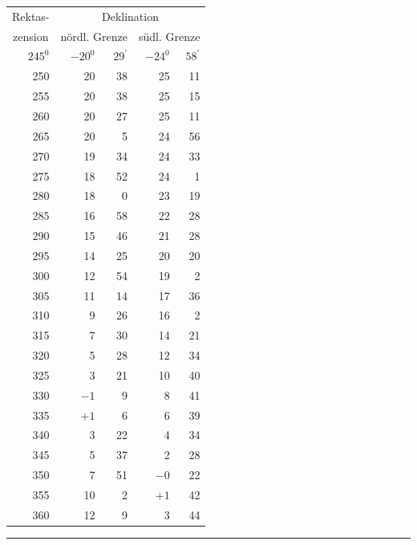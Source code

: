 \begin{center}
\begin{tabular}{|r|r@{\;}r|r@{\;}r|}
\multicolumn{1}{|c|}{Rektas-}&\multicolumn{4}{c|}{Deklination}\\
\multicolumn{1}{|c|}{zension}&\multicolumn{2}{c|}{nördl. Grenze}&\multicolumn{2}{c|}{südl. Grenze}\\
\(245^{0}\)&\(-20^{0}\)&\(29^{\prime}\)&\(-24^{0}\)&\(58^{\prime}\)\\
250&20&38&25&11\\
255&20&38&25&15\\
260&20&27&25&11\\
265&20&5&24&56\\
270&19&34&24&33\\
275&18&52&24&1\\
280&18&0&23&19\\
285&16&58&22&28\\
290&15&46&21&28\\
295&14&25&20&20\\
300&12&54&19&2\\
305&11&14&17&36\\
310&9&26&16&2\\
315&7&30&14&21\\
320&5&28&12&34\\
325&3&21&10&40\\
330&\(-1\)&9&8&41\\
335&\(+1\)&6&6&39\\
340&3&22&4&34\\
345&5&37&2&28\\
350&7&51&\(-0\)&22\\
355&10&2&\(+1\)&42\\
360&12&9&3&44\\\hline
\end{tabular}
\end{center}
\endgroup
\par\medskip\begin{center}\rule{.22\textwidth}{.3pt}\end{center}
